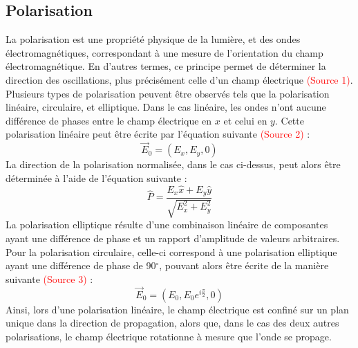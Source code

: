\documentclass[11pt,letterpaper]{article}
\begin{document}
\subsection{Polarisation}
La polarisation est une propriété physique de la lumière, et des ondes électromagnétiques, correspondant à une mesure de l'orientation du champ électromagnétique. En d'autres termes, ce principe permet de déterminer la direction des oscillations, plus précisément celle d'un champ électrique \textcolor{red}{(Source 1)}. Plusieurs types de polarisation peuvent être observés tels que la polarisation linéaire, circulaire, et elliptique. Dans le cas linéaire, les ondes n'ont aucune différence de phases entre le champ électrique en $x$ et celui en $y$. Cette polarisation linéaire peut être écrite par l'équation suivante \textcolor{red}{(Source 2)} :
\begin{equation}
  \vec{E}_{0}=(E_{x},E_{y},0)
\end{equation}
La direction de la polarisation normalisée, dans le cas ci-dessus, peut alors être déterminée à l'aide de l'équation suivante :
\begin{equation}
  \hat{P}=\frac{E_{x}\hat{x}+E_{y}\hat{y}}{\sqrt{E_{x}^{2}+E_{y}^{2}}}
\end{equation}
La polarisation elliptique résulte d'une combinaison linéaire de composantes ayant une différence de phase et un rapport d'amplitude de valeurs arbitraires. Pour la polarisation circulaire, celle-ci correspond à une polarisation elliptique ayant une différence de phase de 90$^\circ$, pouvant alors être écrite de la manière suivante \textcolor{red}{(Source 3)} :
\begin{equation}
  \vec{E}_{0}=(E_{0},E_{0}e^{i\frac{\pi}{2}},0)
\end{equation}
Ainsi, lors d'une polarisation linéaire, le champ électrique est confiné sur un plan unique dans la direction de propagation, alors que, dans le cas des deux autres polarisations, le champ électrique rotationne à mesure que l'onde se propage.

\end{document}
